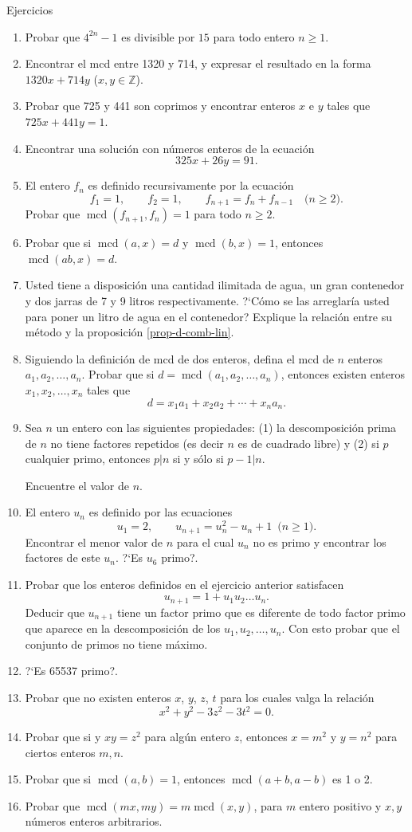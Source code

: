 \documentclass[11pt,spanish,makeidx]{amsbook}
\theoremstyle{definition}
\theoremstyle{remark}
\newcommand \mcd{\operatorname{mcd}}
\begin{document}
\begin{section}{Ejercicios}
\begin{enumerate}
\item Probar que $4^{2n}-1$ es divisible por $15$ para todo entero $n\ge 1$.
\item Encontrar el mcd entre 1320 y 714, y expresar el resultado en la forma $1320x+714y$ ($x,y \in \mathbb Z$).
\item Probar que 725 y 441 son coprimos y encontrar enteros $x$ e $y$ tales que $725x+441y=1$.
\item Encontrar una solución con números enteros de la ecuación
$$ 325x+26y=91.$$
\item El entero $f_n$ es definido recursivamente por la ecuación
$$
f_1=1,\qquad f_2=1, \qquad f_{n+1} = f_n + f_{n-1} \quad
\text{($n\ge 2$)}.
$$
Probar que $\mcd(f_{n+1},f_n)=1$ para todo $n\ge2$.
\item Probar que si $\mcd(a,x)=d$ y $\mcd(b,x)=1$, entonces $\mcd(ab,x)=d$.
\item Usted tiene a disposición una cantidad ilimitada de agua, un gran contenedor y dos jarras de 7 y 9 litros respectivamente. ?`Cómo se las arreglaría usted para poner un litro de agua en el contenedor? Explique la relación entre su método y la proposición \ref{prop-d-comb-lin}.
\item Siguiendo la definición de mcd de dos enteros, defina el mcd de $n$ enteros $a_1,a_2,\ldots,a_n$. Probar que si $d=\mcd(a_1,a_2,\ldots,a_n)$, entonces existen enteros $x_1,x_2,\ldots,x_n$ tales que
$$
d=x_1a_1+x_2a_2+\cdots+x_na_n.
$$
\item Sea $n$ un entero con las siguientes propiedades: (1) la descomposición prima de $n$ no tiene factores repetidos (es decir $n$ es de cuadrado libre) y (2) si $p$ cualquier primo, entonces $p|n$ si  y sólo si $p-1|n$.

Encuentre el valor de $n$.
\item El entero $u_n$ es definido por las ecuaciones
$$
u_1=2,\qquad u_{n+1}=u_n^2-u_n+1 \,\,\, \text{($n\ge1$)}.
$$
Encontrar el menor valor de $n$ para el cual $u_n$ no es primo y encontrar los factores de este $u_n$. ?`Es $u_6$ primo?.
\item Probar que los enteros definidos en el ejercicio anterior satisfacen
$$
u_{n+1}= 1 + u_1u_2 \ldots u_n.
$$
Deducir que $u_{n+1}$ tiene un factor primo que es diferente de todo factor primo que aparece en la descomposición de los $u_1,u_2,\ldots,u_n$. Con esto probar que el conjunto de primos no tiene máximo.
\item ?`Es 65537 primo?.
\item Probar que no existen enteros $x$, $y$, $z$, $t$ para los cuales valga la relación
$$
x^2+y^2-3z^2-3t^2=0.
$$
\item Probar que si y $xy=z^2$ para algún entero $z$, entonces $x=m^2$ y $y=n^2$ para ciertos enteros $m,n$.
\item Probar que si $\mcd(a,b)=1$, entonces $\mcd(a+b,a-b)$ es 1 o 2.

\item Probar que   $\mcd(mx,my)= m \mcd(x,y)$, para $m$ entero positivo  y $x,y$ números enteros arbitrarios.
\end{enumerate}
\end{section}
\end{document}
